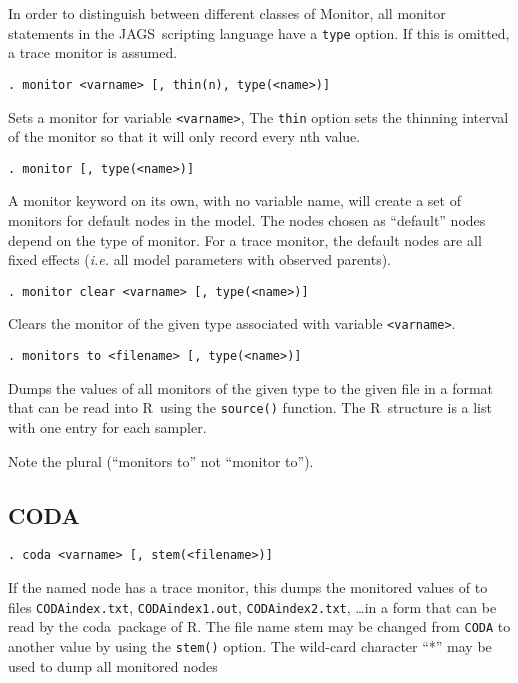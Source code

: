 \documentclass[11pt, a4paper, titlepage]{report}
\newcommand{\JAGS}{\textsf{JAGS}}
\newcommand{\R}{\textsf{R}}
\newcommand{\CODA}{\textsf{coda}}
\begin{document}
In order to distinguish between different classes of Monitor, all
monitor statements in the \JAGS\ scripting language have a
\texttt{type} option. If this is omitted, a trace monitor is assumed.

\begin{verbatim}
. monitor <varname> [, thin(n), type(<name>)]
\end{verbatim}
Sets a monitor for variable \texttt{<varname>}, The \texttt{thin}
option sets the thinning interval of the monitor so that it will only
record every nth value. 

\begin{verbatim}
. monitor [, type(<name>)]
\end{verbatim}
A monitor keyword on its own, with no variable name, will create a set
of monitors for default nodes in the model.  The nodes chosen as
``default'' nodes depend on the type of monitor.  For a trace monitor,
the default nodes are all fixed effects ({\em i.e.} all model
parameters with observed parents).

\begin{verbatim}
. monitor clear <varname> [, type(<name>)]
\end{verbatim}
Clears the monitor of the given type associated with variable
\texttt{<varname>}. 

\begin{verbatim}
. monitors to <filename> [, type(<name>)]
\end{verbatim}
Dumps the values of all monitors of the given type to the given file
in a format that can be read into \R\ using the \verb+source()+
function.  The \R\ structure is a list with one entry for each sampler.

Note the plural (``monitors to'' not ``monitor to'').

\subsection{CODA}

\begin{verbatim}
. coda <varname> [, stem(<filename>)] 
\end{verbatim}
If the named node has a trace monitor, this dumps the monitored values
of to files \texttt{CODAindex.txt}, \texttt{CODAindex1.out},
\texttt{CODAindex2.txt}, \ldots in a form that can be read by the
\CODA\ package of \R.  The file name stem may be changed from
\texttt{CODA} to another value by using the \texttt{stem()}
option. The wild-card character ``*'' may be used to dump all
monitored nodes
\end{document}
